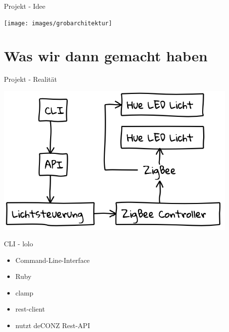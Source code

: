 \begin{frame}{Projekt - Idee}
  \begin{center}
    \texttt{[image: images/grobarchitektur]}
  \end{center}
\end{frame}

\section{Was wir dann gemacht haben}

\begin{frame}{Projekt - Realität}
  \begin{center}
    \includegraphics[width=0.9\textwidth]{images/realworld}
  \end{center}
\end{frame}

\begin{frame}{CLI - lolo}
  \Large
  \begin{itemize}
    \item Command-Line-Interface
    \item Ruby
    \item clamp
    \item rest-client
    \item nutzt deCONZ Rest-API
  \end{itemize}
\end{frame}